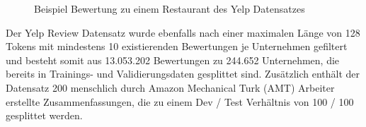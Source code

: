 \begin{figure}[!h]
    \centering
    \scriptsize
    \caption{Beispiel Bewertung zu einem Restaurant des Yelp Datensatzes}
\end{figure}

Der Yelp Review Datensatz wurde ebenfalls nach einer maximalen Länge von 128 Tokens mit mindestens 10 existierenden Bewertungen je Unternehmen gefiltert und besteht somit aus 13.053.202 Bewertungen zu 244.652 Unternehmen, die bereits in Trainings- und Validierungsdaten gesplittet sind. 
Zusätzlich enthält der Datensatz 200 menschlich durch Amazon Mechanical Turk (AMT) Arbeiter erstellte Zusammenfassungen, die zu einem Dev / Test Verhältnis von 100 / 100 gesplittet werden. 
\pagebreak
